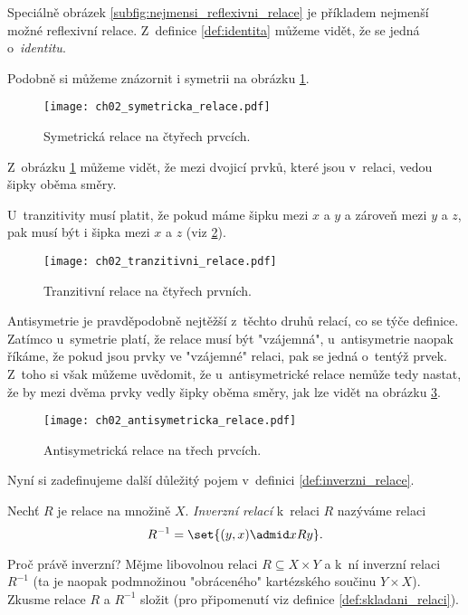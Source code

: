 Speciálně obrázek \ref{subfig:nejmensi_reflexivni_relace} je příkladem nejmenší možné reflexivní relace. Z~definice \ref{def:identita} můžeme vidět, že se jedná o~\emph{identitu}.\par
Podobně si můžeme znázornit i symetrii na obrázku \ref{fig:priklad_symetricke_relace}.
\begin{figure}[H]
    \centering
    \texttt{[image: ch02\_symetricka\_relace.pdf]}
    \caption{Symetrická relace na čtyřech prvcích.}
    \label{fig:priklad_symetricke_relace}
\end{figure}
Z~obrázku \ref{fig:priklad_symetricke_relace} můžeme vidět, že mezi dvojicí prvků, které jsou v~relaci, vedou šipky oběma směry.\par
U~tranzitivity musí platit, že pokud máme šipku mezi $x$ a $y$ a zároveň mezi $y$ a $z$, pak musí být i šipka mezi $x$ a $z$ (viz \ref{fig:priklad_tranzitivni_relace}).
\begin{figure}[H]
    \centering
    \texttt{[image: ch02\_tranzitivni\_relace.pdf]}
    \caption{Tranzitivní relace na čtyřech prvních.}
    \label{fig:priklad_tranzitivni_relace}
\end{figure}
Antisymetrie je pravděpodobně nejtěžší z~těchto druhů relací, co se týče definice. Zatímco u~symetrie platí, že relace musí být "vzájemná", u~antisymetrie naopak říkáme, že pokud jsou prvky ve "vzájemné" relaci, pak se jedná o~tentýž prvek. Z~toho si však můžeme uvědomit, že u~antisymetrické relace nemůže tedy nastat, že by mezi dvěma prvky vedly šipky oběma směry, jak lze vidět na obrázku \ref{fig:priklad_antisymetricke_relace}.
\begin{figure}[H]
    \centering
    \texttt{[image: ch02\_antisymetricka\_relace.pdf]}
    \caption{Antisymetrická relace na třech prvcích.}
    \label{fig:priklad_antisymetricke_relace}
\end{figure} 
Nyní si zadefinujeme další důležitý pojem v~definici \ref{def:inverzni_relace}.
\begin{definition}\label{def:inverzni_relace}
    Nechť $R$ je relace na množině $X$. \emph{Inverzní relací} k~relaci $R$ nazýváme relaci
    \begin{equation*}
        R^{-1}=\set{(y,x) \admid xRy}.
    \end{equation*}
\end{definition}
Proč právě inverzní? Mějme libovolnou relaci $R\subseteq X\times Y$ a k~ní inverzní relaci $R^{-1}$ (ta je naopak podmnožinou "obráceného" kartézského součinu $Y\times X$). Zkusme relace $R$ a $R^{-1}$ složit (pro připomenutí viz definice \ref{def:skladani_relaci}).
